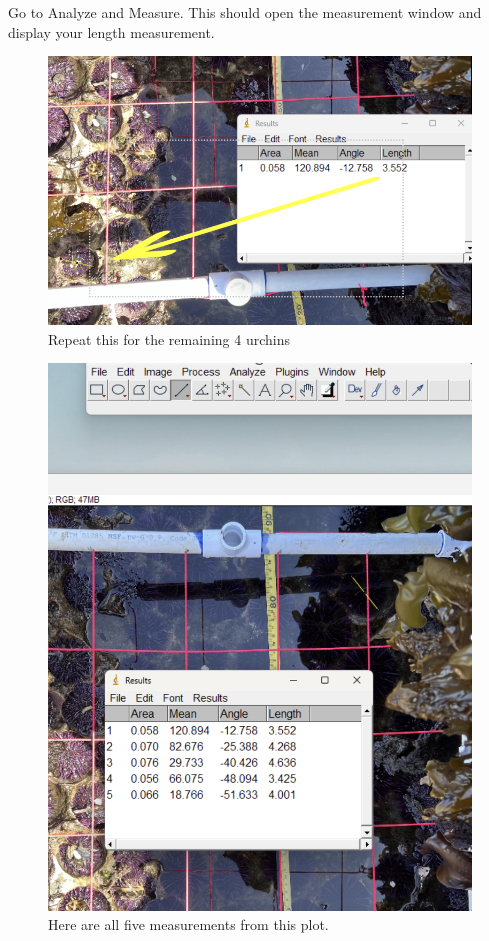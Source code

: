 \documentclass[12pt,letterpaper]{article}
\begin{document}
Go to Analyze and Measure. This should open the measurement window and display your length measurement. 

\begin{figure}[H]
	\centering
	\includegraphics[width=.75\linewidth]{figs/Measure.png}
	\caption{Repeat this for the remaining 4 urchins}
	\label{fig:logo}
\end{figure}

\begin{figure}[H]
	\centering
	\includegraphics[width=1\linewidth]{figs/AllFive.png}
	\caption{Here are all five measurements from this plot.}
	\label{fig:logo}
\end{figure}
\end{document}
